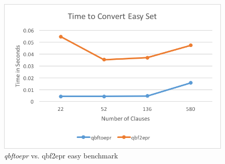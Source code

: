 \begin{figure}[h]
\caption{\textit{qbftoepr} vs. qbf2epr easy benchmark}
\label{qbftoeprvsqbf2epreasy}
\begin{CenteredBox}
\includegraphics{png/qbftoeprvsqbf2epreasy.png}
\end{CenteredBox}
\end{figure}
